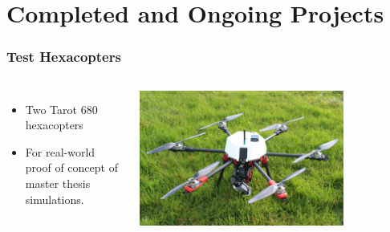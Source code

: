 \documentclass[aspectratio=169]{rubeamer}
\begin{document}
\section{Completed and Ongoing Projects}

\begin{frame}
  \frametitle{Test Hexacopters}
  \begin{columns}
    \begin{itemize}
      \item Two Tarot 680 hexacopters
      \item For real-world proof of concept of master thesis simulations.
    \end{itemize}
    \centering
    \includegraphics[width=0.75\textwidth]{coral_drone}\\
  \end{columns}
\end{frame}
\end{document}
